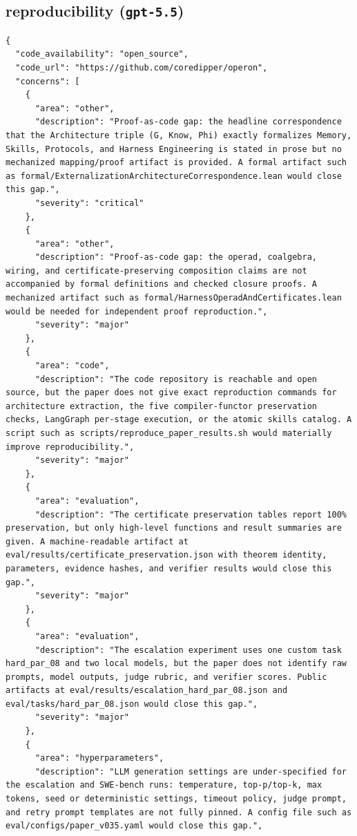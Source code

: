 \documentclass[11pt]{article}
\begin{document}
\subsection*{reproducibility (\texttt{gpt-5.5})}
\begin{verbatim}
{
  "code_availability": "open_source",
  "code_url": "https://github.com/coredipper/operon",
  "concerns": [
    {
      "area": "other",
      "description": "Proof-as-code gap: the headline correspondence that the Architecture triple (G, Know, Phi) exactly formalizes Memory, Skills, Protocols, and Harness Engineering is stated in prose but no mechanized mapping/proof artifact is provided. A formal artifact such as formal/ExternalizationArchitectureCorrespondence.lean would close this gap.",
      "severity": "critical"
    },
    {
      "area": "other",
      "description": "Proof-as-code gap: the operad, coalgebra, wiring, and certificate-preserving composition claims are not accompanied by formal definitions and checked closure proofs. A mechanized artifact such as formal/HarnessOperadAndCertificates.lean would be needed for independent proof reproduction.",
      "severity": "major"
    },
    {
      "area": "code",
      "description": "The code repository is reachable and open source, but the paper does not give exact reproduction commands for architecture extraction, the five compiler-functor preservation checks, LangGraph per-stage execution, or the atomic skills catalog. A script such as scripts/reproduce_paper_results.sh would materially improve reproducibility.",
      "severity": "major"
    },
    {
      "area": "evaluation",
      "description": "The certificate preservation tables report 100% preservation, but only high-level functions and result summaries are given. A machine-readable artifact at eval/results/certificate_preservation.json with theorem identity, parameters, evidence hashes, and verifier results would close this gap.",
      "severity": "major"
    },
    {
      "area": "evaluation",
      "description": "The escalation experiment uses one custom task hard_par_08 and two local models, but the paper does not identify raw prompts, model outputs, judge rubric, and verifier scores. Public artifacts at eval/results/escalation_hard_par_08.json and eval/tasks/hard_par_08.json would close this gap.",
      "severity": "major"
    },
    {
      "area": "hyperparameters",
      "description": "LLM generation settings are under-specified for the escalation and SWE-bench runs: temperature, top-p/top-k, max tokens, seed or deterministic settings, timeout policy, judge prompt, and retry prompt templates are not fully pinned. A config file such as eval/configs/paper_v035.yaml would close this gap.",

\end{verbatim}
\end{document}

